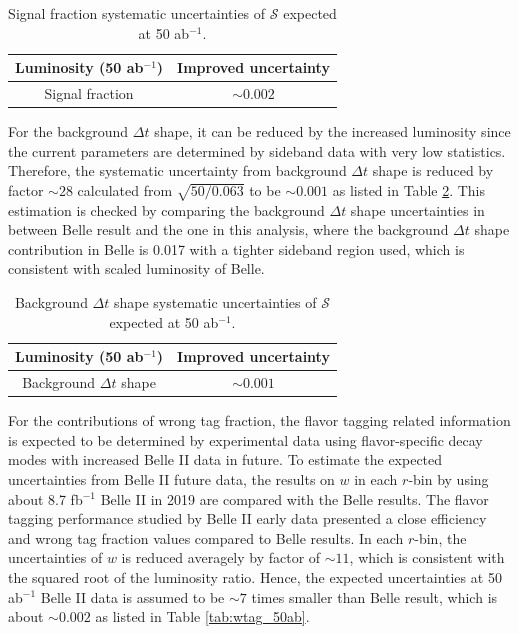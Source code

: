 \begin{table}[htpb]
	\centering
	\caption{ Signal fraction systematic uncertainties of $\mathcal{S}$ expected at 50 ab$^{-1}$.}
	\label{tab:sig_f}
	\begin{tabular}{c| c}
		\hline
		Luminosity (50 ab$^{-1}$) & Improved uncertainty \\
		\hline
		Signal fraction &  $\sim0.002$ \\
		\hline
	\end{tabular}
\end{table}

For the background $\Delta t$ shape, it can be reduced by the increased luminosity since the current parameters are determined by sideband data with very low statistics. Therefore, the systematic uncertainty from background $\Delta t$ shape is reduced by factor $\sim 28$ calculated from $\sqrt{50/0.063}$ to be $\sim 0.001$ as listed in Table \ref{tab:bkg_shape}. This estimation is checked by comparing the background $\Delta t$ shape uncertainties in between Belle result and the one in this analysis, where the background $\Delta t$ shape contribution in Belle is 0.017\cite{kang2020measurement} with a tighter sideband region used, which is consistent with scaled luminosity of Belle. 

\begin{table}[htpb]
	\centering
	\caption{ Background $\Delta t$ shape systematic uncertainties of $\mathcal{S}$ expected at 50 ab$^{-1}$.}
	\label{tab:bkg_shape}
	\begin{tabular}{c| c}
		\hline
		Luminosity (50 ab$^{-1}$) & Improved uncertainty \\
		\hline
		Background $\Delta t$ shape &  $\sim0.001$ \\
		\hline
	\end{tabular}
\end{table}

For the contributions of wrong tag fraction, the flavor tagging related information is expected to be determined by experimental data using flavor-specific decay modes with increased Belle II data in future. To estimate the expected uncertainties from Belle II future data, the results on $w$ in each $r$-bin by using about 8.7 fb$^{-1}$ Belle II in 2019 are compared with the Belle results\cite{abudinen2020first}. The flavor tagging performance studied by Belle II early data presented a close efficiency and wrong tag fraction values compared to Belle results. In each $r$-bin, the uncertainties of $w$ is reduced averagely by factor of $\sim 11$, which is consistent with the squared root of the luminosity ratio. Hence, the expected uncertainties at 50 ab$^{-1}$ Belle II data is assumed to be $\sim 7$ times smaller than Belle result\cite{kang2020measurement}, which is about $\sim0.002$ as listed in Table \ref{tab:wtag_50ab}.

